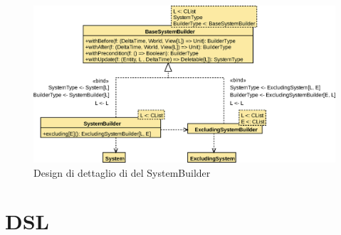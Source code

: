 \begin{figure}
    \includegraphics{./img/SystemBuilder}
    \caption{Design di dettaglio di del SystemBuilder}
    \label{fig:system-builder}
\end{figure}

\section{DSL}\label{sec:dsl}
